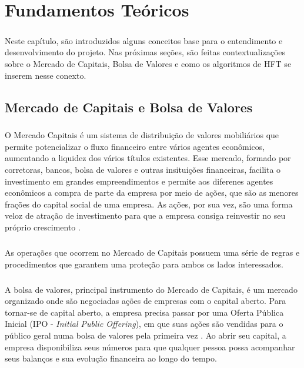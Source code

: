 \documentclass[grad,numbers]{coppe}
\begin{document}
\chapter{Fundamentos Teóricos}
  
    \paragraph{}Neste capítulo, são introduzidos alguns conceitos base para o entendimento e desenvolvimento do projeto. Nas próximas seções, são feitas contextualizações sobre o Mercado de Capitais, Bolsa de Valores e como os algoritmos de HFT se inserem nesse conexto.
    
    \section{Mercado de Capitais e Bolsa de Valores}
        \paragraph{}O Mercado Capitais é um sistema de distribuição de valores mobiliários que permite potencializar o fluxo financeiro entre vários agentes econômicos, aumentando a liquidez dos vários títulos existentes. Esse mercado, formado por corretoras, bancos, bolsa de valores e outras insituições financeiras, facilita o investimento em grandes empreendimentos e permite aos diferenes agentes econômicos a compra de parte da empresa por meio de ações, que são as menores frações do capital social de uma empresa. As ações, por sua vez, são uma forma veloz de atração de investimento para que a empresa consiga reinvestir no seu próprio crescimento \cite{barreto-mercado-capitais}.
        
        \paragraph{}As operações que ocorrem no Mercado de Capitais possuem uma série de regras e procedimentos que garantem uma proteção para ambos os lados interessados. 
        
        \paragraph{}A bolsa de valores, principal instrumento do Mercado de Capitais, é um mercado organizado onde são negociadas ações de empresas com o capital aberto. Para tornar-se de capital aberto, a empresa precisa passar por uma Oferta Pública Inicial (IPO - \textit{Initial Public Offering}), em que suas ações são vendidas para o público geral numa bolsa de valores pela primeira vez \cite{pwc-ipo}. Ao abrir seu capital, a empresa disponibiliza seus números para que qualquer pessoa possa acompanhar seus balanços e sua evolução financeira ao longo do tempo.
        
\end{document}
